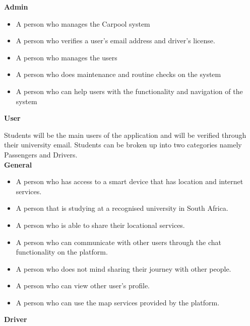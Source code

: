 \documentclass[hidelinks, 12pt, a4paper]{article}
\begin{document}
\Large{ \textbf{Admin} }
\normalsize
\begin{itemize}
      \item A person who manages the Carpool system
      \item A person who verifies a user’s email address and driver’s license.
      \item 	A person who manages the users
      \item 	A person who does maintenance and routine checks on the system
      \item 	A person who can help users with the functionality and navigation of the system

\end{itemize}

\vspace{0.5cm}
\Large{\textbf{User}}
\normalsize

Students will be the main users of the application and will be verified through their university email. Students can be broken up into two categories namely Passengers and Drivers.\\

\large{ \textbf{General} }

\begin{itemize}

      \item A person who has access to a smart device that has location and internet services.
      \item A person that is studying at a recognised university in South Africa.
      \item A person who is able to share their locational services.
      \item A person who can communicate with other users through the chat functionality on the platform.
      \item A person who does not mind sharing their journey with other people.
      \item A person who can view other user's profile.
      \item A person who can use the map services provided by the platform.
\end{itemize}
\vspace{5.0cm}

\large{ \textbf{Driver} }
\end{document}
